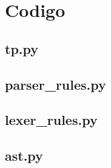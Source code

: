 \section{Codigo}
\subsection{tp.py}


\subsection{parser\_rules.py}


\subsection{lexer\_rules.py}


\subsection{ast.py}

